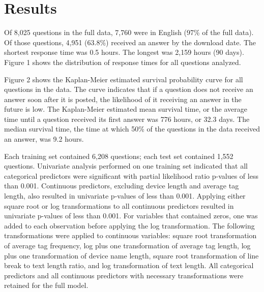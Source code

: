 \documentclass[]{interact}\usepackage[]{graphicx}\usepackage[]{color}
\begin{document}
\section{Results}



% 

  Of 8,025 questions in the full data, 7,760 were in English (97\% of the full data). Of those questions, 4,951 (63.8\%) received an answer by the download date. The shortest response time was 0.5 hours. The longest was 2,159 hours (90 days). Figure 1 shows the distribution of response times for all questions analyzed. 



Figure 2 shows the Kaplan-Meier estimated survival probability curve for all questions in the data. The curve indicates that if a question does not receive an answer soon after it is posted, the likelihood of it receiving an answer in the future is low. The Kaplan-Meier estimated mean survival time, or the average time until a question received its first answer was 776 hours, or 32.3 days. The median survival time, the time at which 50\% of the questions in the data received an answer, was 9.2 hours.




Each training set contained 6,208 questions; each test set contained 1,552 questions. Univariate analysis performed on one training set indicated that all categorical predictors were significant with partial likelihood ratio p-values of less than 0.001. Continuous predictors, excluding device length and average tag length, also resulted in univariate p-values of less than 0.001. Applying either square root or log transformations to all continuous predictors resulted in univariate p-values of less than 0.001. For variables that contained zeros, one was added to each observation before applying the log transformation. The following transformations were applied to continuous variables: square root transformation of average tag frequency, log plus one transformation of average tag length, log plus one transformation of device name length, square root transformation of line break to text length ratio, and log transformation of text length. All categorical predictors and all continuous predictors with necessary transformations were retained for the full model. 
\end{document}
